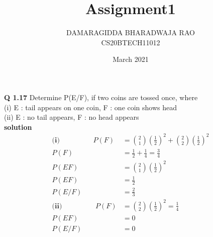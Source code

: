 \documentclass{article}
\title{Assignment1}
\author{DAMARAGIDDA BHARADWAJA RAO\\CS20BTECH11012}
\date{March 2021}
\begin{document}
\maketitle
\begin{multicols*}{2}
\noindent
\textbf{Q 1.17} Determine P(E/F), if two coins are tossed
once, where\\
(i) E : tail appears on one coin, F : one coin
shows head\\
\vspace{0.5cm}
(ii) E : no tail appears, F : no head appears\\
\textbf{solution}\\
\begin{align*}
\textbf{(i)}\hspace{2cm} P(F) &= \binom{2}{1} \left(\frac{1}{2}\right) ^2 + \binom{2}{2} \left(\frac{1}{2}\right) ^2\\
P(F) &= \frac{1}{2} + \frac{1}{4} = \frac{3}{4}\\
P(EF) &= \binom{2}{1} \left(\frac{1}{2}\right) ^2\\
P(EF) &= \frac{1}{2}\\
P(E/F) &= \frac{2}{3}\\
\textbf{(ii)}\hspace{2cm} P(F) &= \binom{2}{2} \left(\frac{1}{2}\right)^2 = \frac{1}{4}\\
P(EF) &= 0\\
P(E/F) &= 0
\end{align*}
\end{multicols*}
\end{document}
